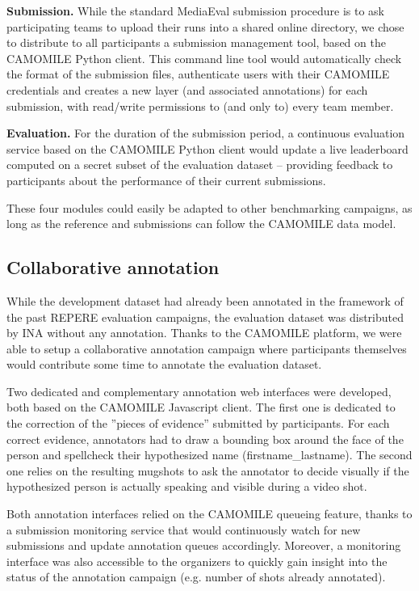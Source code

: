 \documentclass[10pt, a4paper]{article}
\begin{document}
\textbf{Submission.}  While the standard MediaEval submission procedure is to ask
participating teams to upload their runs into a shared online directory, we
chose to distribute to all participants a submission management tool, based on
the CAMOMILE Python client. This command line tool would automatically check
the format of the submission files, authenticate users with their CAMOMILE
credentials and creates a new layer (and associated annotations) for each
submission, with read/write permissions to (and only to) every team member.

\textbf{Evaluation.} For the duration of the submission period, a continuous
evaluation service based on the CAMOMILE Python client would update a live
leaderboard computed on a secret subset of the evaluation dataset -- providing
feedback to participants about the performance of their current submissions.

These four modules could easily be adapted to other benchmarking campaigns, as
long as the reference and submissions can follow the CAMOMILE data model.


\subsection{Collaborative annotation}

While the development dataset had already been annotated in the framework of
the past REPERE evaluation campaigns, the evaluation dataset was distributed by
INA without any annotation. Thanks to the CAMOMILE platform, we were able to
setup a collaborative annotation campaign where participants themselves would
contribute some time to annotate the evaluation dataset.

Two dedicated and complementary annotation web interfaces were developed, both
based on the CAMOMILE Javascript client. The first one is dedicated to the
correction of the ''pieces of evidence'' submitted by participants. For each correct
evidence, annotators had to draw a bounding box around the face of the person
and spellcheck their hypothesized name (firstname\_lastname). The second one
relies on the resulting mugshots to ask the annotator to decide visually if
the hypothesized person is actually speaking and visible during a video shot.

Both annotation interfaces relied on the CAMOMILE queueing feature, thanks to
a submission monitoring service that would continuously watch for new
submissions and update annotation queues accordingly. Moreover, a monitoring
interface was also accessible to the organizers to quickly gain insight into
the status of the annotation campaign (e.g. number of shots already annotated).
\end{document}
